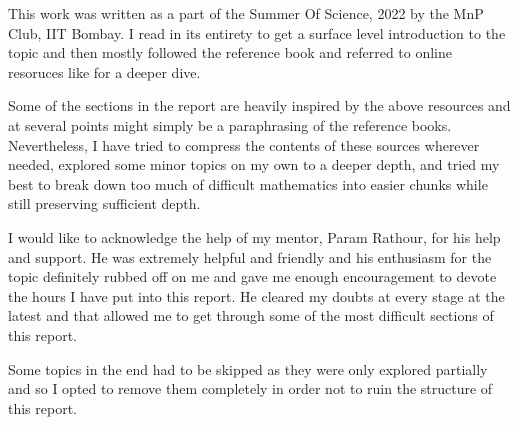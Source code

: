 		This work was written as a part of the Summer Of Science, 2022 by the MnP Club, IIT Bombay. I read in its entirety \cite{CodeBook} to get a surface level introduction to the topic and then mostly followed the reference book \cite{Silverman} and referred to online resoruces like \cite{Hypr} for a deeper dive. \par Some of the sections in the report are heavily inspired by the above resources and at several points might simply be a paraphrasing of the reference books. Nevertheless, I have tried to compress the contents of these sources wherever needed, explored some minor topics on my own to a deeper depth, and tried my best to break down too much of difficult mathematics into easier chunks while still preserving sufficient depth. \par I would like to acknowledge the help of my mentor, Param Rathour, for his help and support. He was extremely helpful and friendly and his enthusiasm for the topic definitely rubbed off on me and gave me enough encouragement to devote the hours I have put into this report. He cleared my doubts at every stage at the latest and that allowed me to get through some of the most difficult sections of this report.\par Some topics in the end had to be skipped as they were only explored partially and so I opted to remove them completely in order not to ruin the structure of this report.\normalsize